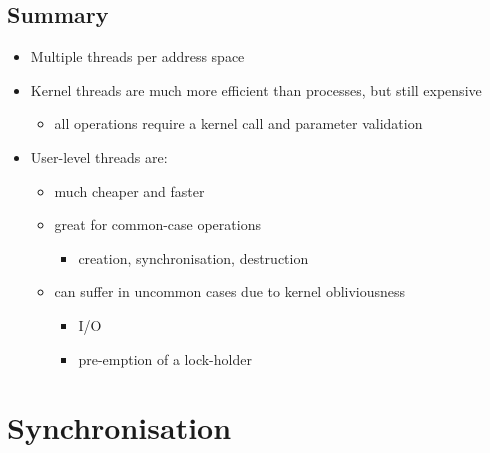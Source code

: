 \documentclass[11pt,a4paper]{article}
\begin{document}
\subsection{Summary}
\begin{itemize}
    \item Multiple threads per address space
    \item Kernel threads are much more efficient than processes, but still expensive
        \begin{itemize}
            \item all operations require a kernel call and parameter validation
        \end{itemize}
    \item User-level threads are:
        \begin{itemize}
            \item much cheaper and faster
            \item great for common-case operations
                \begin{itemize}
                    \item creation, synchronisation, destruction
                \end{itemize}
            \item can suffer in uncommon cases due to kernel obliviousness
                \begin{itemize}
                    \item I/O
                    \item pre-emption of a lock-holder
                \end{itemize}
        \end{itemize}
\end{itemize}

\break{}

\section{Synchronisation}
\end{document}
